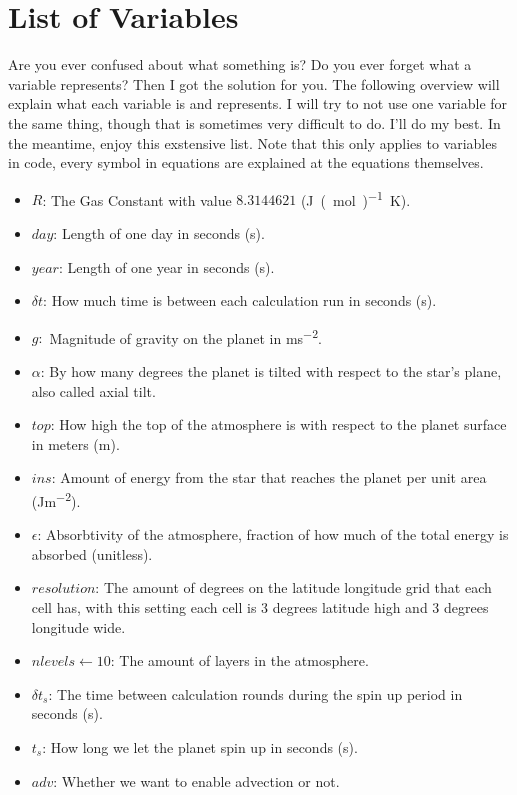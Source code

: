 \section{List of Variables}
Are you ever confused about what something is? Do you ever forget what a variable represents? Then I got the solution for you. The following overview will explain what each variable is and 
represents. I will try to not use one variable for the same thing, though that is sometimes very difficult to do. I'll do my best. In the meantime, enjoy this exstensive list. Note that this 
only applies to variables in code, every symbol in equations are explained at the equations themselves.

\begin{itemize}
    \item $R$: The Gas Constant with value $8.3144621$ (\si{J(mol)^{-1}K}).
    \item $day$: Length of one day in seconds (\si{s}).
    \item $year$: Length of one year in seconds (\si{s}).
    \item $\delta t$: How much time is between each calculation run in seconds (\si{s}).
    \item $g:$ Magnitude of gravity on the planet in \si{ms^{-2}}.
    \item $\alpha$: By how many degrees the planet is tilted with respect to the star's plane, also called axial tilt.
    \item $top$: How high the top of the atmosphere is with respect to the planet surface in meters (\si{m}).
    \item $ins$: Amount of energy from the star that reaches the planet per unit area (\si{Jm^{-2}}).
    \item $\epsilon$: Absorbtivity of the atmosphere, fraction of how much of the total energy is absorbed (unitless).
    \item $resolution$: The amount of degrees on the latitude longitude grid that each cell has, with this setting each cell is 3 degrees latitude high and 3 degrees longitude wide.
    \item $nlevels \leftarrow 10$: The amount of layers in the atmosphere.
    \item $\delta t_s$: The time between calculation rounds during the spin up period in seconds (\si{s}).
    \item $t_s$: How long we let the planet spin up in seconds (\si{s}).
    \item $adv$: Whether we want to enable advection or not.

\end{itemize}
